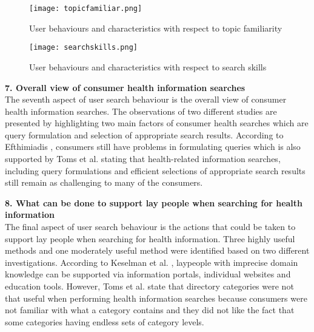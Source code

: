 \documentclass[]{article}
\begin{document}
\begin{figure}[t!]
	\texttt{[image: topicfamiliar.png]}
	\caption{User behaviours and characteristics with respect to topic familiarity\label{fig2}}
\end{figure} 

\begin{figure}[t!]
	\texttt{[image: searchskills.png]}
	\caption{User behaviours and characteristics with respect to search skills\label{fig3}}
\end{figure} 


\vspace{0.25cm}

\textbf{7. Overall view of consumer health information searches}\\

The seventh aspect of user search behaviour is the overall view of consumer health information searches. The observations of two different studies are presented by highlighting two main factors of consumer health searches which are query formulation and selection of appropriate search results. According to Efthimiadis \cite{efthimiadis2009students}, consumers still have problems in formulating queries which is also supported by Toms et al. \cite{toms2007consumers} stating that health-related information searches, including query formulations and efficient selections of appropriate search results still remain as challenging to many of the consumers.  

\vspace{0.25cm}

\textbf{8. What can be done to support lay people when searching for health information}\\

The final aspect of user search behaviour is the actions that could be taken to support lay people when searching for health information. Three highly useful methods and one moderately useful method were identified based on two different investigations. According to Keselman et al. \cite{keselman2008consumer}, laypeople with imprecise domain knowledge can be supported via information portals, individual websites and education tools. However, Toms et al. \cite{toms2007consumers} state that directory categories were not that useful when performing health information searches because consumers were not familiar with what a category contains and they did not like the fact that some categories having endless sets of category levels. 
\end{document}
